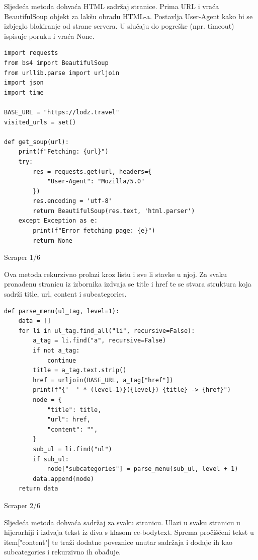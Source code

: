 \documentclass[]{foi}
\begin{document}
Sljedeća metoda dohvaća HTML sadržaj stranice. Prima URL i vraća BeautifulSoup objekt za lakšu obradu HTML-a. Postavlja User-Agent 
kako bi se izbjeglo blokiranje od strane servera. U slučaju do pogreške (npr. timeout) ispisuje poruku i vraća None. 

\begin{longlisting}
\begin{verbatim}
import requests
from bs4 import BeautifulSoup
from urllib.parse import urljoin
import json
import time

BASE_URL = "https://lodz.travel"
visited_urls = set()

def get_soup(url):
    print(f"Fetching: {url}")
    try:
        res = requests.get(url, headers={
            "User-Agent": "Mozilla/5.0"
        })
        res.encoding = 'utf-8'
        return BeautifulSoup(res.text, 'html.parser')
    except Exception as e:
        print(f"Error fetching page: {e}")
        return None
\end{verbatim}
\caption{Scraper 1/6}
\label{lst:scraper1}
\end{longlisting}

Ova metoda rekurzivno prolazi kroz listu i sve li stavke u njoj. Za svaku pronađenu stranicu iz izbornika izdvaja se title i href te se stvara
struktura koja sadrži title, url, content i subcategories.

\begin{longlisting}
\begin{verbatim}
def parse_menu(ul_tag, level=1):
    data = []
    for li in ul_tag.find_all("li", recursive=False):
        a_tag = li.find("a", recursive=False)
        if not a_tag:
            continue
        title = a_tag.text.strip()
        href = urljoin(BASE_URL, a_tag["href"])
        print(f"{'  ' * (level-1)}({level}) {title} -> {href}")
        node = {
            "title": title,
            "url": href,
            "content": "",
        }
        sub_ul = li.find("ul")
        if sub_ul:
            node["subcategories"] = parse_menu(sub_ul, level + 1)
        data.append(node)
    return data
\end{verbatim}
\caption{Scraper 2/6}
\label{lst:scraper2}
\end{longlisting}

Sljedeća metoda dohvaća sadržaj za svaku stranicu. Ulazi u svaku stranicu u hijerarhiji i izdvaja tekst iz diva s klasom ce-bodytext.
Sprema pročišćeni tekst u item["content"] te traži dodatne poveznice unutar sadržaja i dodaje ih kao subcategories i rekurzivno ih obađuje.
\end{document}
